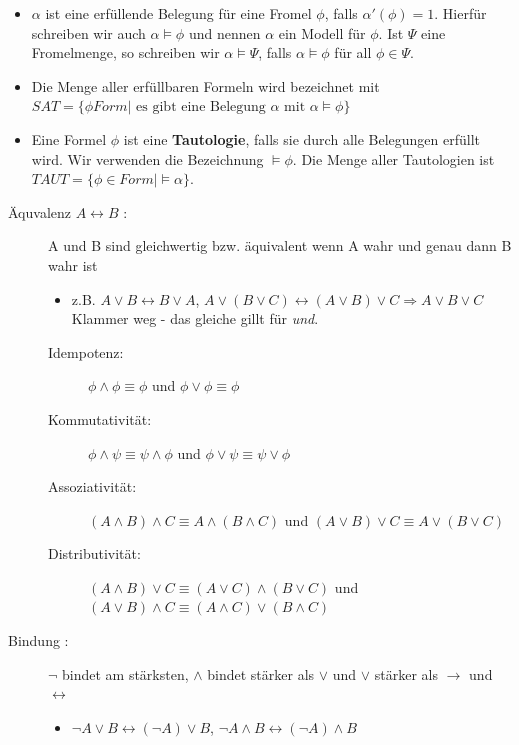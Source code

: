 \documentclass[8pt,landscape]{article}
\begin{document}
\begin{multicols}{3}
\begin{itemize}
\item $ \alpha $ ist eine erf\"ullende Belegung f\"ur eine Fromel $ \phi $, falls $ \alpha'(\phi) = 1 $. Hierf\"ur schreiben wir auch $ \alpha \models \phi $ und nennen $ \alpha $ ein 
Modell f\"ur $ \phi $. Ist $ \Psi $ eine Fromelmenge, so schreiben wir $ \alpha \models \Psi $, falls $ \alpha \models \phi $ f\"ur all $ \phi \in \Psi $.
\item Die Menge aller erf\"ullbaren Formeln wird bezeichnet mit $ SAT = \{\phi Form | \text{ es gibt eine Belegung } \alpha \text{ mit } \alpha \models \phi\} $
\item Eine Formel $ \phi $ ist eine \textbf{Tautologie}, falls sie durch alle Belegungen erf\"ullt wird. Wir verwenden die Bezeichnung $ \models \phi $. Die Menge aller Tautologien ist $ TAUT = \{\phi \in Form | \models \alpha\} $.
\end{itemize}
\begin{description}
  \item[\"Aquvalenz $ A \leftrightarrow B $ :] A und B sind gleichwertig bzw. \"aquivalent wenn A wahr und genau dann B wahr ist
    \begin{itemize}
    \item z.B. $ A \vee B \leftrightarrow B \vee A $, $ A \vee ( B \vee C ) \leftrightarrow ( A \vee B ) \vee C \Rightarrow A \vee B \vee C $ Klammer weg - das gleiche gillt f\"ur \textit{und}.
    \end{itemize}
    \begin{description}
      \item[Idempotenz:] $ \phi \wedge \phi \equiv \phi $ und $ \phi \vee \phi \equiv \phi $
      \item[Kommutativit\"at:] $ \phi \wedge \psi \equiv \psi \wedge \phi $ und $ \phi \vee \psi \equiv \psi \vee \phi $
      \item[Assoziativit\"at:] $ (A \wedge B) \wedge C \equiv A \wedge ( B \wedge C) $ und $ (A \vee B) \vee C \equiv A \vee ( B \vee C) $
      \item[Distributivit\"at:] $ (A \wedge B) \vee C \equiv (A \vee C) \wedge (B \vee C) $ und $ (A \vee B) \wedge C \equiv (A \wedge C) \vee (B \wedge C) $
    \end{description}
  \item[Bindung :] $ \neg $ bindet am st\"arksten, $ \wedge $ bindet st\"arker als $ \vee $ und $ \vee $ st\"arker als $ \rightarrow $ und $ \leftrightarrow $
    \begin{itemize}
    \item $ \neg A \vee B \leftrightarrow (\neg A) \vee B $, $ \neg A \wedge B \leftrightarrow (\neg A) \wedge B $

\end{itemize}
\end{description}
\end{multicols}
\end{document}
